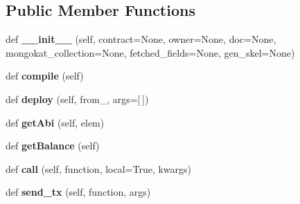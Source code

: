 \subsection*{Public Member Functions}
\begin{DoxyCompactItemize}
\item 
\mbox{\label{classapp_1_1models_1_1contract_1_1_contract_document_ac3314ea82689f76429b9aca23aa5c7f6}} 
def {\bfseries \+\_\+\+\_\+init\+\_\+\+\_\+} (self, contract=None, owner=None, doc=None, mongokat\+\_\+collection=None, fetched\+\_\+fields=None, gen\+\_\+skel=None)
\item 
\mbox{\label{classapp_1_1models_1_1contract_1_1_contract_document_abef0f5f2ff731e1c89c4fb3136ffbcf1}} 
def {\bfseries compile} (self)
\item 
\mbox{\label{classapp_1_1models_1_1contract_1_1_contract_document_a90a1fb45fb01fd1d5d1866965af8d2e5}} 
def {\bfseries deploy} (self, from\+\_\+, args=\mbox{[}$\,$\mbox{]})
\item 
\mbox{\label{classapp_1_1models_1_1contract_1_1_contract_document_a3afcfd9f59fe0cb196354cdf69d6d790}} 
def {\bfseries get\+Abi} (self, elem)
\item 
\mbox{\label{classapp_1_1models_1_1contract_1_1_contract_document_a764436faf3d7bcaf76da24a7a8ee43a5}} 
def {\bfseries get\+Balance} (self)
\item 
\mbox{\label{classapp_1_1models_1_1contract_1_1_contract_document_ab089fe2709f55cc48d7089478dc9efe2}} 
def {\bfseries call} (self, function, local=True, kwargs)
\item 
\mbox{\label{classapp_1_1models_1_1contract_1_1_contract_document_a867cff57ae877d1e1e9c7b2a0fa0cd26}} 
def {\bfseries send\+\_\+tx} (self, function, args)
\end{DoxyCompactItemize}
